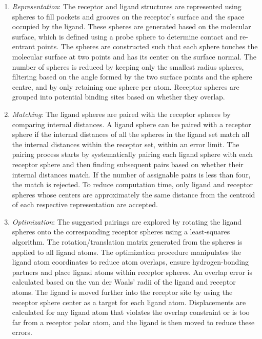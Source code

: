 \begin{enumerate}
    \item \textit{Representation}: The receptor and ligand structures are represented using spheres to fill pockets and grooves on the receptor's surface and the space occupied by the ligand. These spheres are generated based on the molecular surface, which is defined using a probe sphere to determine contact and re-entrant points. The spheres are constructed such that each sphere touches the molecular surface at two points and has its center on the surface normal. The number of spheres is reduced by keeping only the smallest radius spheres, filtering based on the angle formed by the two surface points and the sphere centre, and by only retaining one sphere per atom. Receptor spheres are grouped into potential binding sites based on whether they overlap.
   
    \item \textit{Matching}: The ligand spheres are paired with the receptor spheres by comparing internal distances. A ligand sphere can be paired with a receptor sphere if the internal distances of all the spheres in the ligand set match all the internal distances within the receptor set, within an error limit. The pairing process starts by systematically pairing each ligand sphere with each receptor sphere and then finding subsequent pairs based on whether their internal distances match. If the number of assignable pairs is less than four, the match is rejected. To reduce computation time, only ligand and receptor spheres whose centers are approximately the same distance from the centroid of each respective representation are accepted.

   \item \textit{Optimization}: The suggested pairings are explored by rotating the ligand spheres onto the corresponding receptor spheres using a least-squares algorithm. The rotation/translation matrix generated from the spheres is applied to all ligand atoms. The optimization procedure manipulates the ligand atom coordinates to reduce atom overlaps, ensure hydrogen-bonding partners and place ligand atoms within receptor spheres. An overlap error is calculated based on the van der Waals' radii of the ligand and receptor atoms. The ligand is moved further into the receptor site by using the receptor sphere center as a target for each ligand atom. Displacements are calculated for any ligand atom that violates the overlap constraint or is too far from a receptor polar atom, and the ligand is then moved to reduce these errors.
   
\end{enumerate}

